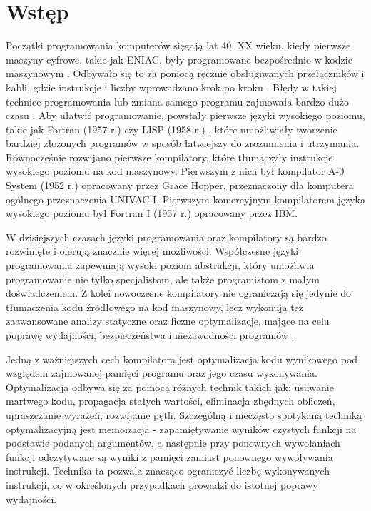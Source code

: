 \chapter{Wstęp}
\label{ch:wstep}

Początki programowania komputerów sięgają lat 40. XX wieku, kiedy pierwsze maszyny cyfrowe, takie jak ENIAC, były programowane bezpośrednio w kodzie maszynowym \cite{bib:the-computer-from-pascal-to-von-neumann}. Odbywało się to za pomocą ręcznie obsługiwanych przełączników i kabli, gdzie instrukcje i liczby wprowadzano krok po kroku \cite{bib:eniac}. Błędy w takiej technice programowania lub zmiana samego programu zajmowała bardzo dużo czasu \cite{bib:eniac}. Aby ułatwić programowanie, powstały pierwsze języki wysokiego poziomu, takie jak Fortran (1957 r.) \cite{bib:programming-languages-history} czy LISP (1958 r.) \cite{bib:programming-languages-history}, które umożliwiały tworzenie bardziej złożonych programów w sposób łatwiejszy do zrozumienia i utrzymania. Równocześnie rozwijano pierwsze kompilatory, które tłumaczyły instrukcje wysokiego poziomu na kod maszynowy. Pierwszym z nich był kompilator A-0 System (1952 r.) opracowany przez Grace Hopper, przeznaczony dla komputera ogólnego przeznaczenia UNIVAC I. Pierwszym komercyjnym kompilatorem języka wysokiego poziomu był Fortran I (1957 r.) opracowany przez IBM.

W dzisiejszych czasach języki programowania oraz kompilatory są bardzo rozwinięte i oferują znacznie więcej możliwości. Współczesne języki programowania zapewniają wysoki poziom abstrakcji, który umożliwia programowanie nie tylko specjalistom, ale także programistom z małym doświadczeniem. Z kolei nowoczesne kompilatory nie ograniczają się jedynie do tłumaczenia kodu źródłowego na kod maszynowy, lecz wykonują też zaawansowane analizy statyczne oraz liczne optymalizacje, mające na celu poprawę wydajności, bezpieczeństwa i niezawodności programów \cite{bib:engineering-a-compiler}.

Jedną z ważniejszych cech kompilatora jest optymalizacja kodu wynikowego pod względem zajmowanej pamięci programu oraz jego czasu wykonywania. Optymalizacja odbywa się za pomocą różnych technik takich jak: usuwanie martwego kodu, propagacja stałych wartości, eliminacja zbędnych obliczeń, upraszczanie wyrażeń, rozwijanie pętli. Szczególną i nieczęsto spotykaną techniką optymalizacyjną jest memoizacja \cite{bib:haskell-memoization} - zapamiętywanie wyników czystych funkcji na podstawie podanych argumentów, a następnie przy ponownych wywołaniach funkcji odczytywane są wyniki z pamięci zamiast ponownego wywoływania instrukcji. Technika ta pozwala znacząco ograniczyć liczbę wykonywanych instrukcji, co w określonych przypadkach prowadzi do istotnej poprawy wydajności.

